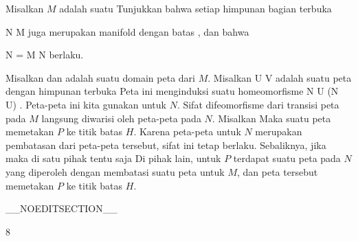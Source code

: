 {

Misalkan $M$ adalah suatu
Tunjukkan bahwa setiap himpunan bagian terbuka

\mavergleichskette
{\vergleichskette
{ N
}
{ \subseteq }{ M
}
{  }{
}
{    }{
}
{   }{
}
}
{}{}{}
juga merupakan manifold dengan batas
 {} {},
dan bahwa

\mavergleichskettedisp
{\vergleichskette
{ \partial N
}
{ =} { \partial M \cap N
}
{ } {
}
{ } {
}
{ } {
}
}
{}{}{}
berlaku.

}
{

Misalkan
 dan
 adalah suatu domain peta dari $M$. Misalkan
\maabbdisp {\alpha} { U } {V
} {}
adalah suatu peta dengan himpunan terbuka
 Peta ini menginduksi suatu homeomorfisme
\maabbdisp {} {N \cap U} { \alpha (N \cap U)
} {.}
Peta-peta ini kita gunakan untuk $N$. Sifat difeomorfisme dari transisi peta pada $M$ langsung diwarisi oleh peta-peta pada $N$. Misalkan
 Maka suatu peta memetakan $P$ ke titik batas $H$. Karena peta-peta untuk $N$ merupakan pembatasan dari peta-peta tersebut, sifat ini tetap berlaku. Sebaliknya, jika
 maka di satu pihak tentu saja
 Di pihak lain, untuk $P$ terdapat suatu peta pada $N$ yang diperoleh dengan membatasi suatu peta untuk $M$, dan peta tersebut memetakan $P$ ke titik batas $H$.

 }

__NOEDITSECTION__

{8}

